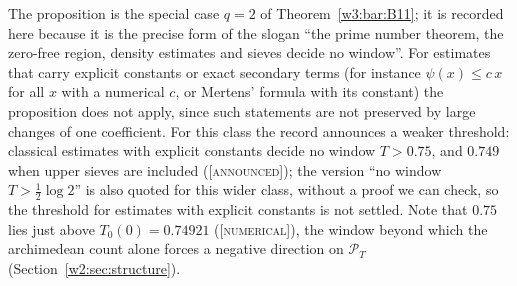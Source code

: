 \documentclass[11pt]{amsart}
\theoremstyle{definition}
\theoremstyle{remark}
\numberwithin{equation}{section}
\newcommand{\PT}{\mathcal{P}_T}                        %
\newcommand{\stag}[1]{\textsc{[#1]}}
\newcommand{\NUM}{\stag{numerical}}
\newcommand{\ANNOUNCED}{\stag{announced}}
\begin{document}
The proposition is the special case $q=2$ of Theorem~\ref{w3:bar:B11}; it is recorded here because it is the
precise form of the slogan ``the prime number theorem, the zero-free region, density estimates and sieves
decide no window''. For estimates that carry explicit constants or exact secondary terms (for instance
$\psi(x)\le c\,x$ for all $x$ with a numerical $c$, or Mertens' formula with its constant) the proposition does not apply, since such statements are not preserved by large
changes of one coefficient. For this class the record announces a weaker threshold: classical estimates with
explicit constants decide no window $T>0.75$, and $0.749$ when upper sieves are included (\ANNOUNCED); the
version ``no window $T>\frac12\log2$'' is also quoted for this wider class, without a proof we can check, so the
threshold for estimates with explicit constants is not settled. Note that $0.75$ lies just above
$T_0(0)=0.74921$ (\NUM), the window beyond which the archimedean count alone forces a negative direction on
$\PT$ (Section~\ref{w2:sec:structure}).
\end{document}
